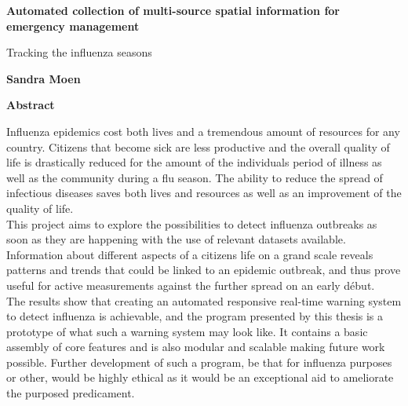\thispagestyle{plain}
\begin{center}
	\Large
	\textbf{Automated collection of multi-source spatial information for emergency management}
	
	\vspace{0.4cm}
	\large
	Tracking the influenza seasons
	
	\vspace{0.4cm}
	\textbf{Sandra Moen}
	
	\vspace{0.9cm}
	\textbf{Abstract}
\end{center}
Influenza epidemics cost both lives and a tremendous amount of resources for any country. Citizens that become sick are less productive and the overall quality of life is drastically reduced for the amount of the individuals period of illness as well as the community during a flu season. The ability to reduce the spread of infectious diseases saves both lives and resources as well as an improvement of the quality of life. \\

This project aims to explore the possibilities to detect influenza outbreaks as soon as they are happening with the use of relevant datasets available. Information about different aspects of a citizens life on a grand scale reveals patterns and trends that could be linked to an epidemic outbreak, and thus prove useful for active measurements against the further spread on an early début. \\

The results show that creating an automated responsive real-time warning system to detect influenza is achievable, and the program presented by this thesis is a prototype of what such a warning system may look like. It contains a basic assembly of core features and is also modular and scalable making future work possible. Further development of such a program, be that for influenza purposes or other, would be highly ethical as it would be an exceptional aid to ameliorate the purposed predicament.

